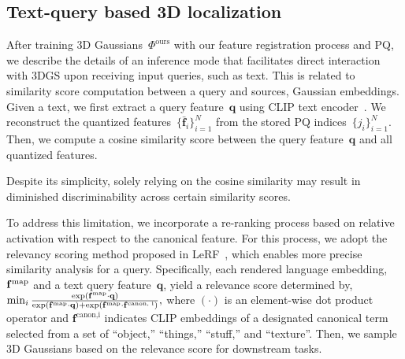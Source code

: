 



\subsection{Text-query based 3D localization}
\label{subsec:4_3}

After training 3D Gaussians~$\Phi^\text{ours}$ with our feature registration process and PQ, we describe the details of an inference mode that facilitates direct interaction with 3DGS upon receiving input queries, such as text. 
This is related to similarity score computation between a query and sources, \ie Gaussian embeddings. Given a text, we first extract a query feature~$\mathbf{q}$ using CLIP text encoder~\cite{clip}. We reconstruct the quantized features~$\{ \bar{\mathbf{f}}_i \}_{i=1}^N$ from the stored PQ indices~$\{ j_i \}_{i=1}^N$. Then, we compute a cosine similarity score between the query feature~$\mathbf{q}$ and all quantized features.

Despite its simplicity, solely relying on the cosine similarity may result in diminished discriminability across certain similarity scores.
 
To address this limitation, we incorporate a re-ranking process based on relative activation with respect to the canonical feature. For this process, we adopt the relevancy scoring method proposed in LeRF~\cite{lerf}, which enables more precise similarity analysis for a query.
Specifically, each rendered language embedding, $\mathbf{f}^\text{map}$ and a text query feature~$\mathbf{q}$, yield a relevance score determined by, 
    $\mathop{\min}_i \frac{
        \exp(\mathbf{f}^\text{map} \cdot \mathbf{q} )
    }{
        \exp(\mathbf{f}^\text{map} \cdot \mathbf{q} ) + \exp(\mathbf{f}^\text{map} \cdot \mathbf{f}^\text{canon, i})
    },$
where $(\cdot)$ is an element-wise dot product operator and $\mathbf{f}^\text{canon,i}$ indicates CLIP embeddings of a designated canonical term selected from a set of ``object,'' ``things,'' ``stuff,'' and ``texture''. Then, we sample 3D Gaussians based on the relevance score for downstream tasks.